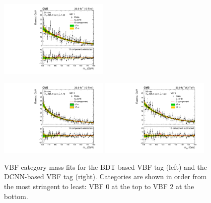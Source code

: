 \begin{figure}[h!]
\begin{center}
        \includegraphics[width=0.47\textwidth]{figures/stats_results/SBplots_jackWSnewVBFTag_1_13TeV.pdf}
    \end{center}
    \begin{center}
        \includegraphics[width=0.47\textwidth]{figures/stats_results/CMS-HIG-16-040_Figure_012-c.pdf}
        \includegraphics[width=0.47\textwidth]{figures/stats_results/SBplots_jackWSnewVBFTag_2_13TeV.pdf}
    \end{center}
    \caption{VBF category mass fits for the BDT-based VBF tag (left) and the DCNN-based VBF tag (right).
             Categories are shown in order from the most stringent to least: VBF 0 at the top to VBF 2 at the bottom.}
        \label{fig:stats_results:vbf_mass_plots}
\end{figure}


